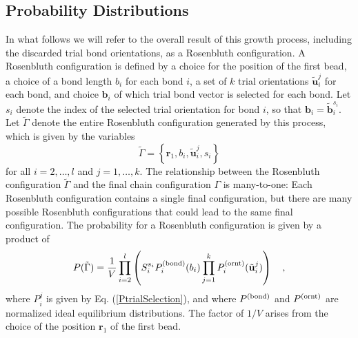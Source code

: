 \documentclass[12pt]{article} %
\newcommand{\vv}[1]{\mathbf{#1}}
\newcommand\chain{\Gamma}
\newcommand\vbead{\vv{r}}
\newcommand\nbead{l}
\newcommand\vbond{\vv{b}}
\newcommand\rbond{b}
\newcommand\ntrial{k}
\newcommand\vtrial{\tilde{\vv{b}}}
\newcommand\utrial{\tilde{\vv{u}}}
\newcommand\Pbond{P^{({\rm bond})}}
\newcommand\Pornt{P^{({\rm ornt})}}
\newcommand\rconfig{\tilde{\chain}}
\begin{document}
\subsection{Probability Distributions}
In what follows we will refer to the overall result of this growth process, 
including the discarded trial bond orientations, as a Rosenbluth configuration. A 
Rosenbluth configuration is defined by a choice for the position of the first bead, 
a choice of a bond length $b_{i}$ for each bond $i$, a set of $\ntrial$ trial 
orientations $\utrial_{i}^{j}$ for each bond, and choice $\vbond_{i}$ of which 
trial bond vector is selected for each bond.  Let $s_{i}$ denote the index of 
the selected trial orientation for bond $i$, so that 
$\vbond_{i} = \vtrial_{i}^{s_{i}}$.  Let $\rconfig$ denote the entire Rosenbluth 
configuration generated by this process, which is given by the variables
\begin{equation}
   \rconfig = \left \{ \vbead_{1},\rbond_{i},\utrial_{i}^{j},s_{i} \right \}
\end{equation}
for all $i=2,\ldots,\nbead$ and $j=1,\ldots,\ntrial$. The relationship between 
the Rosenbluth configuration $\rconfig$ and the final chain configuration $\chain$ is many-to-one: Each Rosenbluth configuration contains a single final configuration, but there are many possible Rosenbluth configurations that could lead to the same final configuration.  The probability for a Rosenbluth configuration is given by a product of
\begin{equation}
   P(\rconfig) = \frac{1}{V}
                 \prod_{i=2}^{\nbead} \left (
                 S^{s_{i}}_{i}
                 \Pbond_{i}(\rbond_{i})
                 \prod_{j=1}^{\ntrial}
                 \Pornt_{i}(\utrial_{i}^{j}) \right )
   \quad, \label{RosenbluthProbability}
\end{equation}
where $P_{i}^{j}$ is given by Eq. (\ref{PtrialSelection}), and where $\Pbond$
and $\Pornt$ are normalized ideal equilibrium distributions.  The factor of 
$1/V$ arises from the choice of the position $\vbead_{1}$ of the first bead. 
\end{document}
